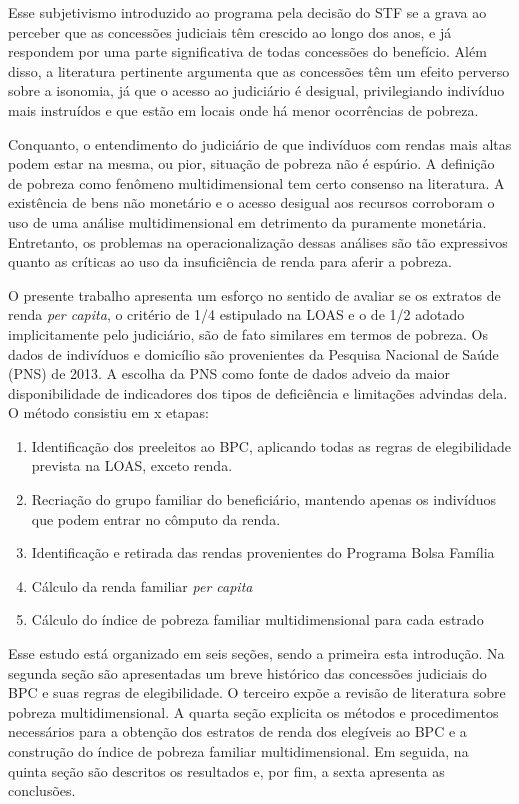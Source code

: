 \documentclass[
	12pt,				%
	openright,			%
	twoside,			%
	a4paper,			%
	english,			%
	french,				%
	spanish,			%
	brazil				%
	]{abntex2}
\begin{document}
Esse subjetivismo introduzido ao programa pela decisão do STF se a grava ao perceber que as concessões judiciais têm crescido ao longo dos anos, e já respondem por uma parte significativa de todas concessões do benefício. Além disso, a literatura pertinente argumenta que as concessões têm um efeito perverso sobre a isonomia, já que o acesso ao judiciário é desigual, privilegiando indivíduo mais instruídos e que estão em locais onde há menor ocorrências de pobreza.

Conquanto, o entendimento do judiciário de que indivíduos com rendas mais altas podem estar na mesma, ou pior, situação de pobreza não é espúrio. A definição de pobreza como fenômeno multidimensional tem certo consenso na literatura. A existência de bens não monetário e o acesso desigual aos recursos corroboram o uso de uma análise multidimensional em detrimento da puramente monetária. Entretanto, os problemas na operacionalização dessas análises são tão expressivos quanto as críticas ao uso da insuficiência de renda para aferir a pobreza. 

O presente trabalho apresenta um esforço no sentido de avaliar se os extratos de renda \textit{per capita}, o critério de 1/4 estipulado na LOAS e o de 1/2 adotado implicitamente pelo judiciário, são de fato similares em termos de pobreza. Os dados de indivíduos e domicílio são provenientes da Pesquisa Nacional de Saúde (PNS) de 2013. A escolha da PNS como fonte de dados adveio da maior disponibilidade de indicadores dos tipos de deficiência e limitações advindas dela. O método consistiu em x etapas:

\begin{enumerate}
	\item Identificação dos preeleitos ao BPC, aplicando todas as regras de elegibilidade prevista na LOAS, exceto renda.
	\item Recriação do grupo familiar do beneficiário, mantendo apenas os indivíduos que podem entrar no cômputo da renda.
	\item Identificação e retirada das rendas provenientes do Programa Bolsa Família
	\item Cálculo da renda familiar \textit{per capita}
	\item Cálculo do índice de pobreza familiar multidimensional para cada estrado
\end{enumerate}

Esse estudo está organizado em seis seções, sendo a primeira esta introdução. Na segunda seção são apresentadas um breve histórico das concessões judiciais do BPC e suas regras de elegibilidade. O terceiro expõe a revisão de literatura sobre pobreza multidimensional. A quarta seção explicita os métodos e procedimentos necessários para a obtenção dos estratos de renda dos elegíveis ao BPC e a construção do índice de pobreza familiar multidimensional. Em seguida, na quinta seção são descritos os resultados e, por fim, a sexta apresenta as conclusões.
 
\end{document}
